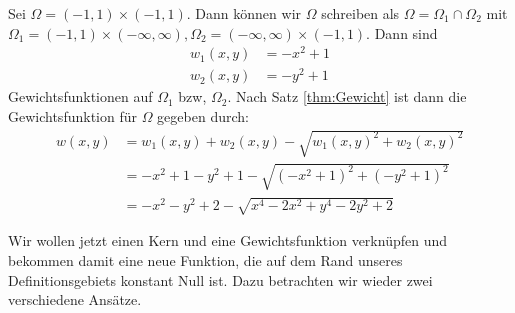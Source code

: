 \begin{example}
\label{ex:Gewicht}
Sei $\Omega = (-1,1) \times (-1,1)$. Dann können wir $\Omega$ schreiben als $\Omega = \Omega_1  \cap \Omega_2$ mit $\Omega_1 = (-1,1) \times (- \infty, \infty), \Omega_2 =   (- \infty, \infty) \times (-1,1)$.
Dann sind 
\begin{align*}
w_1(x,y) &= -x^2 +1\\
w_2(x,y) &= -y^2 +1 
\end{align*}
Gewichtsfunktionen auf $\Omega_1$ bzw, $\Omega_2$. Nach Satz \ref{thm:Gewicht} ist dann die Gewichtsfunktion für $\Omega$ gegeben durch:
\begin{align*}
w(x,y) &= w_1(x,y) + w_2(x,y) - \sqrt{w_1(x,y)^2 + w_2(x,y)^2}\\
&= -x^2 +1 -y^2 +1 - \sqrt{(-x^2+1)^2 + (-y^2+1)^2}\\
&= -x^2-y^2+2 - \sqrt{x^4 -2x^2 + y^4 -2y^2+2}
\end{align*}
\end{example}
Wir wollen jetzt einen Kern und eine Gewichtsfunktion verknüpfen und bekommen damit eine neue Funktion, die auf dem Rand unseres Definitionsgebiets konstant Null ist. Dazu betrachten wir wieder zwei verschiedene Ansätze.

